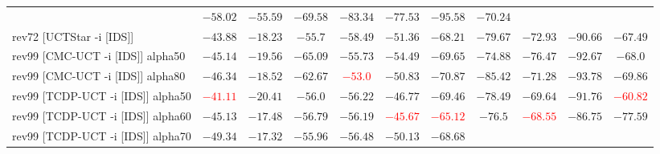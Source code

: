 \documentclass{article}
\begin{document}
\begin{tabular}{|l|r@{$\pm$}rr@{$\pm$}rr@{$\pm$}rr@{$\pm$}rr@{$\pm$}rr@{$\pm$}rr@{$\pm$}rr@{$\pm$}rr@{$\pm$}rr@{$\pm$}r|}
& \multicolumn{2}{c}{$-58.02$}
& \multicolumn{2}{c}{$-55.59$}
& \multicolumn{2}{c}{$-69.58$}
& \multicolumn{2}{c}{$-83.34$}
& \multicolumn{2}{c}{$-77.53$}
& \multicolumn{2}{c}{$-95.58$}
& \multicolumn{2}{c|}{$-70.24$}
\\
rev72 [UCTStar -i [IDS]]
& \multicolumn{2}{c}{$-43.88$}
& \multicolumn{2}{c}{$-18.23$}
& \multicolumn{2}{c}{$-55.7$}
& \multicolumn{2}{c}{$-58.49$}
& \multicolumn{2}{c}{$-51.36$}
& \multicolumn{2}{c}{$-68.21$}
& \multicolumn{2}{c}{$-79.67$}
& \multicolumn{2}{c}{$-72.93$}
& \multicolumn{2}{c}{$-90.66$}
& \multicolumn{2}{c|}{$-67.49$}
\\
\hline
rev99 [CMC-UCT -i [IDS]] alpha50
& \multicolumn{2}{c}{$-45.14$}
& \multicolumn{2}{c}{$-19.56$}
& \multicolumn{2}{c}{$-65.09$}
& \multicolumn{2}{c}{$-55.73$}
& \multicolumn{2}{c}{$-54.49$}
& \multicolumn{2}{c}{$-69.65$}
& \multicolumn{2}{c}{$-74.88$}
& \multicolumn{2}{c}{$-76.47$}
& \multicolumn{2}{c}{$-92.67$}
& \multicolumn{2}{c|}{$-68.0$}
\\
rev99 [CMC-UCT -i [IDS]] alpha80
& \multicolumn{2}{c}{$-46.34$}
& \multicolumn{2}{c}{$-18.52$}
& \multicolumn{2}{c}{$-62.67$}
& \multicolumn{2}{c}{\textbf{\textcolor{red}{$-53.0$}}}
& \multicolumn{2}{c}{$-50.83$}
& \multicolumn{2}{c}{$-70.87$}
& \multicolumn{2}{c}{$-85.42$}
& \multicolumn{2}{c}{\textbf{$-71.28$}}
& \multicolumn{2}{c}{$-93.78$}
& \multicolumn{2}{c|}{$-69.86$}
\\
rev99 [TCDP-UCT -i [IDS]] alpha50
& \multicolumn{2}{c}{\textbf{\textcolor{red}{$-41.11$}}}
& \multicolumn{2}{c}{$-20.41$}
& \multicolumn{2}{c}{$-56.0$}
& \multicolumn{2}{c}{$-56.22$}
& \multicolumn{2}{c}{\textbf{$-46.77$}}
& \multicolumn{2}{c}{$-69.46$}
& \multicolumn{2}{c}{$-78.49$}
& \multicolumn{2}{c}{\textbf{$-69.64$}}
& \multicolumn{2}{c}{$-91.76$}
& \multicolumn{2}{c|}{\textbf{\textcolor{red}{$-60.82$}}}
\\
rev99 [TCDP-UCT -i [IDS]] alpha60
& \multicolumn{2}{c}{$-45.13$}
& \multicolumn{2}{c}{\textbf{$-17.48$}}
& \multicolumn{2}{c}{$-56.79$}
& \multicolumn{2}{c}{$-56.19$}
& \multicolumn{2}{c}{\textbf{\textcolor{red}{$-45.67$}}}
& \multicolumn{2}{c}{\textbf{\textcolor{red}{$-65.12$}}}
& \multicolumn{2}{c}{$-76.5$}
& \multicolumn{2}{c}{\textbf{\textcolor{red}{$-68.55$}}}
& \multicolumn{2}{c}{$-86.75$}
& \multicolumn{2}{c|}{$-77.59$}
\\
rev99 [TCDP-UCT -i [IDS]] alpha70
& \multicolumn{2}{c}{$-49.34$}
& \multicolumn{2}{c}{\textbf{$-17.32$}}
& \multicolumn{2}{c}{$-55.96$}
& \multicolumn{2}{c}{$-56.48$}
& \multicolumn{2}{c}{$-50.13$}
& \multicolumn{2}{c}{$-68.68$}

\end{tabular}
\end{document}
